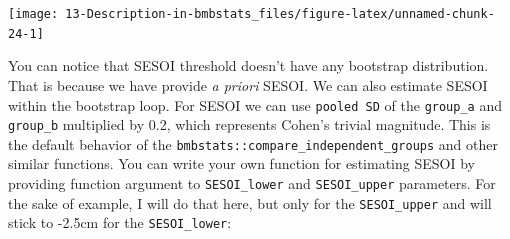 \documentclass[
]{book}
\begin{document}
\begin{center}\texttt{[image: 13-Description-in-bmbstats\_files/figure-latex/unnamed-chunk-24-1]} \end{center}

You can notice that SESOI threshold doesn't have any bootstrap distribution. That is because we have provide \emph{a priori} SESOI. We can also estimate SESOI within the bootstrap loop. For SESOI we can use \texttt{pooled\ SD} of the \texttt{group\_a} and \texttt{group\_b} multiplied by 0.2, which represents Cohen's trivial magnitude. This is the default behavior of the \texttt{bmbstats::compare\_independent\_groups} and other similar functions. You can write your own function for estimating SESOI by providing function argument to \texttt{SESOI\_lower} and \texttt{SESOI\_upper} parameters. For the sake of example, I will do that here, but only for the \texttt{SESOI\_upper} and will stick to -2.5cm for the \texttt{SESOI\_lower}:
\end{document}
